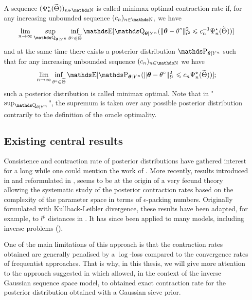 \begin{de}
A sequence $(\Psi^{\star}_{n}(\widetilde{\Theta}))_{n \in \N}$ is called minimax optimal contraction rate if, for any increasing unbounded sequence $(c_{n})_{n \in \N}$, we have
\[\lim_{n \to \infty} \sup_{\Q_{\boldsymbol{\theta} \vert Y^{n}}} \inf_{\theta^{\circ} \in \widetilde{\Theta}} \E[\Q_{\boldsymbol{\theta} \vert Y^{n}}(\Vert \boldsymbol{\theta} - \theta^{\circ} \Vert_{l^{2}}^{2} \leq c_{n}^{-1} \Psi^{\star}_{n}(\widetilde{\Theta}))]\]
 and at the same time there exists a posterior distribution $\P_{\boldsymbol{\theta} \vert Y^{n}}$ such that for any increasing unbounded sequence $(c_{n})_{n \in \N}$ we have \[\lim_{n \to \infty} \inf_{\theta^{\circ} \in \widetilde{\Theta}} \E[\P_{\boldsymbol{\theta} \vert Y^{n}}(\Vert \boldsymbol{\theta} - \theta^{\circ} \Vert_{l^{2}}^{2} \leq c_{n} \Psi^{\star}_{n}(\widetilde{\Theta}))];\]
 such a posterior distribution is called minimax optimal.
Note that in "$\sup_{\Q_{\boldsymbol{\theta} \vert Y^{n}}}$", the supremum is taken over any possible posterior distribution contrarily to the definition of the oracle optimality.
\assEnd
\end{de}

\subsection{Existing central results}\label{INTRO_BAYES_BIBLIO}
Consistence and contraction rate of posterior distributions have gathered interest for a long while one could mention the work of .
More recently, results introduced in  and reformulated in , seems to be at the origin of a very fecund theory allowing the systematic study of the posterior contraction rates based on the complexity of the parameter space in terms of $\epsilon$-packing numbers.
Originally formulated with Kullback-Leibler divergence, these results have been adapted, for example, to $l^{p}$ distances in .
It has since been applied to many models, including inverse problems ().

\medskip

One of the main limitations of this approach is that the contraction rates obtained are generally penalised by a $\log$-loss compared to the convergence rates of frequentist approaches.
That is why, in this thesis, we will give more attention to the approach suggested in  which allowed, in the context of the inverse Gaussian sequence space model, to obtained exact contraction rate for the posterior distribution obtained with a Gaussian sieve prior.